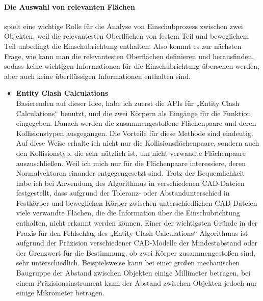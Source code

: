 \documentclass[14pt,a4paper,titlepage]{article}
\begin{document}
			\paragraph{Die Auswahl von relevanten Flächen}
			spielt eine wichtige Rolle für die Analyse von Einschubprozess zwischen zwei Objekten, weil die relevantesten Oberflächen von festem Teil und beweglichem Teil unbedingt die Einschubrichtung enthalten. Also kommt es zur nächsten Frage, wie kann man die relevantesten Oberflächen definieren und herausfinden, sodass keine wichtigen Informationen für die Einschubrichtung übersehen werden, aber auch keine überflüssigen Informationen enthalten sind.
			\begin{itemize}
				\item 
				\textbf{Entity Clash Calculations}
				\\
				Basierenden auf dieser Idee, habe ich zuerst die APIs für „Entity Clash Calculations“ benutzt, und die zwei Körpern als Eingänge für die Funktion eingegeben. Danach werden die zusammengestoßene Flächenpaare und deren Kollisionstypen ausgegangen. Die Vorteile für diese Methode sind eindeutig. Auf diese Weise erhalte ich nicht nur die Kollisionsflächenpaare, sondern auch den Kollisionstyp, die sehr nützlich ist, um nicht verwandte Flächenpaare auszuschließen. Weil ich mich nur für die Flächenpaare interessiere, deren Normalvektoren einander entgegengesetzt sind. \bigbreak Trotz der Bequemlichkeit habe ich bei Anwendung des Algorithmus in verschiedenen CAD-Dateien festgestellt, dass aufgrund der Toleranz- oder Abstandunterschied in Festkörper und beweglichen Körper zwischen unterschiedlichen CAD-Dateien viele verwandte Flächen, die die Information über die Einschubrichtung enthalten, nicht erkannt werden können. Einer der wichtigsten Gründe in der Praxis für den Fehlschlag des „Entity Clash Calculations“ Algorithmus ist aufgrund der Präzision verschiedener CAD-Modelle der Mindestabstand oder der Grenzwert für die Bestimmung, ob zwei Körper zusammengestoßen sind, sehr unterschiedlich. Beispielsweise kann bei einer großen mechanischen Baugruppe der Abstand zwischen Objekten einige Millimeter betragen, bei einem Präzisionsinstrument kann der Abstand zwischen Objekten jedoch nur einige Mikrometer betragen.
				

\end{itemize}
\end{document}
